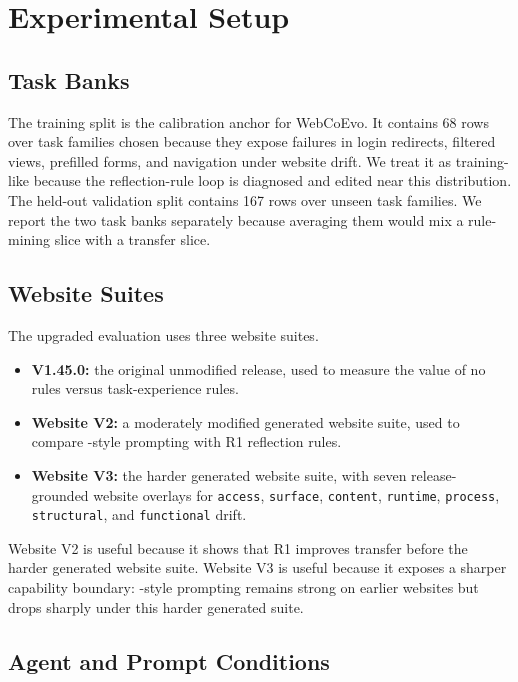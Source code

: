 \section{\linkding{} Experimental Setup}

\subsection{Task Banks}

The training split is the calibration anchor for WebCoEvo. It contains 68 rows over task families chosen because they expose failures in login redirects, filtered views, prefilled forms, and navigation under website drift. We treat it as training-like because the reflection-rule loop is diagnosed and edited near this distribution. The held-out validation split contains 167 rows over unseen task families. We report the two task banks separately because averaging them would mix a rule-mining slice with a transfer slice.

\subsection{Website Suites}

The upgraded evaluation uses three \linkding{} website suites.
\begin{itemize}
\item \textbf{\linkding{} V1.45.0:} the original unmodified \linkding{} release, used to measure the value of no rules versus \expel{} task-experience rules.
\item \textbf{Website V2:} a moderately modified generated website suite, used to compare \expel{}-style prompting with R1 reflection rules.
\item \textbf{Website V3:} the harder generated website suite, with seven release-grounded website overlays for \texttt{access}, \texttt{surface}, \texttt{content}, \texttt{runtime}, \texttt{process}, \texttt{structural}, and \texttt{functional} drift.
\end{itemize}

Website V2 is useful because it shows that R1 improves transfer before the harder generated website suite. Website V3 is useful because it exposes a sharper capability boundary: \expel{}-style prompting remains strong on earlier websites but drops sharply under this harder generated suite.

\subsection{Agent and Prompt Conditions}

